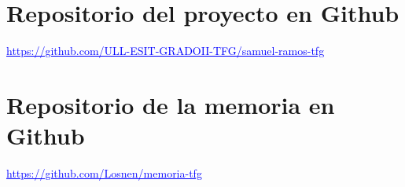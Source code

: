 \section{Repositorio del proyecto en Github}
\label{A:1}

\begin{center}
\textcolor{blue}{\underline{https://github.com/ULL-ESIT-GRADOII-TFG/samuel-ramos-tfg}}
\end{center}

\section{Repositorio de la memoria en Github}
\label{A:1}

\begin{center}
\textcolor{blue}{\underline{https://github.com/Losnen/memoria-tfg}}
\end{center}